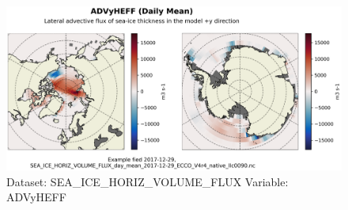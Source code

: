 \begin{figure}[H]
\centering
\includegraphics[scale=0.55]{../images/plots/native_plots/Sea-Ice_and_Snow_Horizontal_Volume_Fluxes/ADVyHEFF.png}
\caption{Dataset: SEA\_ICE\_HORIZ\_VOLUME\_FLUX Variable: ADVyHEFF}
\label{tab:table-SEA_ICE_HORIZ_VOLUME_FLUX_ADVyHEFF-Plot}
\end{figure}
\pagebreak
